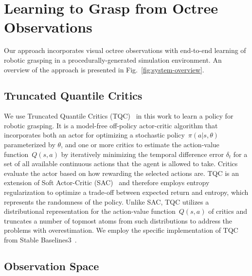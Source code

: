 \section{Learning to Grasp from Octree Observations}\label{sec:learning-to-grasp-from-octree-observations}

Our approach incorporates visual octree observations with end-to-end learning of robotic grasping in a procedurally-generated simulation environment. An overview of the approach is presented in Fig.~\ref{fig:system-overview}.

\subsection{Truncated Quantile Critics}\label{ssec:truncated-quantile-critics}

We use Truncated Quantile Critics (TQC)~\cite{kuznetsov_controlling_2020} in this work to learn a policy for robotic grasping. It is a model-free off-policy actor-critic algorithm that incorporates both an actor for optimizing a stochastic policy~\mbox{\(\pi(a \vert s, \theta)\)} parameterized by \(\theta\), and one or more critics to estimate the action-value function~\mbox{\(Q(s, a)\)} by iteratively minimizing the temporal difference error \(\delta_{t}\) for a set of all available continuous actions that the agent is allowed to take. Critics evaluate the actor based on how rewarding the selected actions are. TQC is an extension of Soft Actor-Critic (SAC)~\cite{haarnoja_soft_2018} and therefore employs entropy regularization to optimize a trade-off between expected return and entropy, which represents the randomness of the policy. Unlike SAC, TQC utilizes a distributional representation for the action-value function~\mbox{\(Q(s, a)\)} of critics and truncates a number of topmost atoms from such distributions to address the problems with overestimation. We employ the specific implementation of TQC from Stable Baselines3~\cite{raffin_stable-baselines3_2021}.

\subsection{Observation Space}\label{ssec:observation-space}

